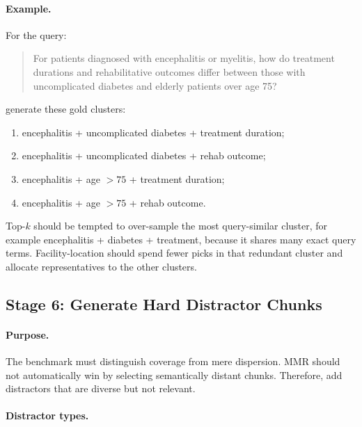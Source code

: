 \documentclass[11pt,a4paper]{article}
\newcommand{\stage}[2]{\subsection{\textcolor{betterblue}{#1}: #2}}
\begin{document}
\paragraph{Example.}
For the query:

\begin{quote}
	For patients diagnosed with encephalitis or myelitis, how do treatment durations and rehabilitative outcomes differ between those with uncomplicated diabetes and elderly patients over age 75?
\end{quote}

generate these gold clusters:

\begin{enumerate}[leftmargin=*]
	\item encephalitis + uncomplicated diabetes + treatment duration;
	\item encephalitis + uncomplicated diabetes + rehab outcome;
	\item encephalitis + age $>75$ + treatment duration;
	\item encephalitis + age $>75$ + rehab outcome.
\end{enumerate}

Top-$k$ should be tempted to over-sample the most query-similar cluster, for example encephalitis + diabetes + treatment, because it shares many exact query terms. Facility-location should spend fewer picks in that redundant cluster and allocate representatives to the other clusters.

\stage{Stage 6}{Generate Hard Distractor Chunks}

\paragraph{Purpose.}
The benchmark must distinguish coverage from mere dispersion. MMR should not automatically win by selecting semantically distant chunks. Therefore, add distractors that are diverse but not relevant.

\paragraph{Distractor types.}
\end{document}
